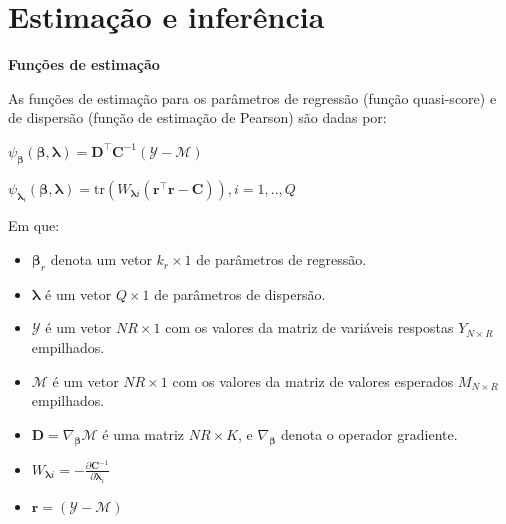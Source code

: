 \documentclass[10pt,
  aspectratio=169,
  serif,
  mathserif,
  professionalfont,
  compress,
  handout,
  ]{beamer}\usepackage[]{graphicx}\usepackage[]{color}
\begin{document}

\section{Estimação e inferência}

\begin{frame}[c, allowframebreaks]

\textbf{Funções de estimação}

As funções de estimação para os parâmetros de regressão (função quasi-score) e de dispersão (função de estimação de Pearson) são dadas por:

\begin{center}
$\psi_{\boldsymbol{\beta}}(\boldsymbol{\beta}, \boldsymbol{\lambda}) = \boldsymbol{D}^\top \boldsymbol{C}^{-1}(\mathcal{Y} - \mathcal{M})$

$\psi_{\boldsymbol{\lambda}_i}(\boldsymbol{\beta}, \boldsymbol{\lambda}) = \mathrm{tr}(W_{\boldsymbol{\lambda}i} (\boldsymbol{r}^\top\boldsymbol{r} - \boldsymbol{C})),  i = 1,.., Q$
\end{center}

Em que:

\begin{itemize}
  
  \item $\boldsymbol{\beta}_r$ denota um vetor $k_r \times 1$ de parâmetros de regressão.
  
  \item $\boldsymbol{\lambda}$ é um vetor $Q \times 1$ de parâmetros de dispersão.
  
  \item $\mathcal{Y}$ é um vetor $NR \times 1$ com os valores da matriz de variáveis respostas $Y_{N \times R}$ empilhados.
  
  \item $\mathcal{M}$ é um vetor $NR \times 1$ com os valores da matriz de valores esperados $M_{N \times R}$ empilhados.
  
  \item $\boldsymbol{D} = \nabla_{\boldsymbol{\beta}} \mathcal{M}$ 
é uma matriz $NR \times K$, e $\nabla_{\boldsymbol{\beta}}$ denota o 
operador gradiente.
  
  \item $W_{\boldsymbol{\lambda}i} = -\frac{\partial
    \boldsymbol{C}^{-1}}{\partial \boldsymbol{\lambda}_i}$ 
    
  \item $\boldsymbol{r} = (\mathcal{Y} - \mathcal{M})$
  
\end{itemize}

\end{frame}
\end{document}
